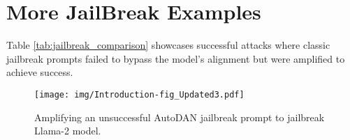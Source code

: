 \section{More JailBreak Examples}

\noindent Table \ref{tab:jailbreak_comparison} showcases successful attacks where classic jailbreak prompts failed to bypass the model's alignment but were amplified to achieve success.



\begin{figure}[h]
    \centering
    \texttt{[image: img/Introduction-fig\_Updated3.pdf]}
    \caption{Amplifying an unsuccessful AutoDAN jailbreak prompt to jailbreak Llama-2 model.}
    \label{fig: 4}
\end{figure}



